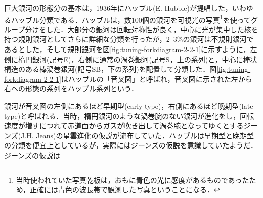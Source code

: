巨大銀河の形態分の基本は，1936年にハッブル(E. Hubble)が提唱した，いわゆるハッブル分類である．ハッブルは，数100個の銀河を可視光の写真\footnote{当時使われていた写真乾板は，おもに青色の光に感度があるものであったため，正確には青色の波長帯で観測した写真ということになる．}を使ってグループ分けをした．大部分の銀河は回転対称性が良く，中心に光が集中した核を持つ規則銀河としてさらに詳細な分類を行ったが，2--3\%の銀河は不規則銀河であるとした，そして規則銀河を図\ref{fig:tuning-forkdiagram-2-2-1}に示すように，左側に楕円銀河(記号E)，右側に通常の渦巻銀河(記号S，上の系列)と，中心に棒状構造のある棒渦巻銀河(記号SB，下の系列)を配置して分類した．図\ref{fig:tuning-forkdiagram-2-2-1}はハッブルの「音叉図」と呼ばれ，音叉図に示された左から右への形態の系列をハッブル系列という．

銀河が音叉図の左側にあるほど早期型(early type)，右側にあるほど晩期型(late type)と呼ばれる．当時，楕円銀河のような渦巻腕のない銀河が進化をし，回転速度が増すにつれて赤道面からガスが吹き出して渦巻腕となってゆくとするジーンズ(J.H. Jeans)の星雲進化の仮説が流布していた．ハッブルは早期型と晩期型の分類を便宜上としているが，実際にはジーンズの仮説を意識していたようだ．ジーンズの仮説は





